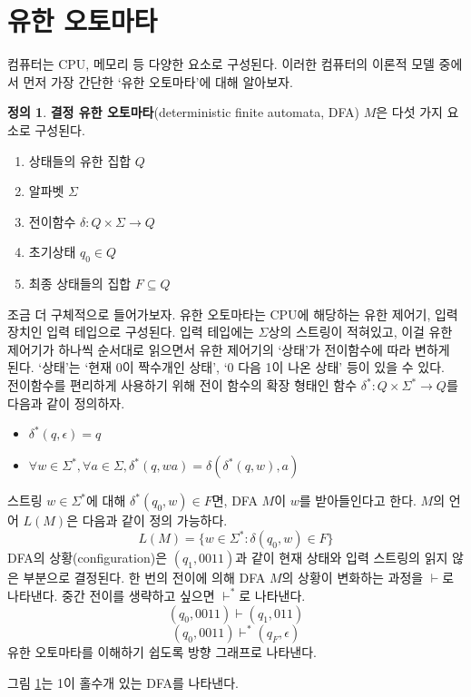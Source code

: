 \documentclass[b5paper, 10pt]{book}
\theoremstyle{definition}
\newtheorem{defn}{정의}[chapter]
\begin{document}
\section{유한 오토마타}
컴퓨터는 CPU, 메모리 등 다양한 요소로 구성된다. 
이러한 컴퓨터의 이론적 모델 중에서 먼저 가장 간단한 `유한 오토마타'에 대해 알아보자.
\begin{defn}
    \textbf{결정 유한 오토마타}(deterministic finite automata, DFA) $M$은 다섯 가지
요소로 구성된다.
\begin{enumerate}
    \item 상태들의 유한 집합 $Q$
    \item 알파벳 $\Sigma$
    \item 전이함수 $\delta : Q \times \Sigma \rightarrow Q$
    \item 초기상태 $q_0 \in Q$
    \item 최종 상태들의 집합 $F \subseteq Q$
\end{enumerate}
\end{defn}
조금 더 구체적으로 들어가보자. 유한 오토마타는 CPU에 해당하는 유한 제어기,
입력장치인 입력 테입으로 구성된다. 입력 테입에는 $\Sigma$상의 스트링이
적혀있고, 이걸 유한 제어기가 하나씩 순서대로 읽으면서 유한 제어기의 `상태'가
전이함수에 따라 변하게 된다. `상태'는 `현재 0이 짝수개인 상태', `0 다음 1이 나온 상태' 등이
있을 수 있다. \\
전이함수를 편리하게 사용하기 위해 전이 함수의 확장 형태인 함수 $\delta^*: Q \times \Sigma^{*} 
\rightarrow Q$를 다음과 같이 정의하자.
\begin{itemize}
    \item $\delta^* (q, \epsilon) = q$
    \item $\forall w \in \Sigma^*, \forall a \in \Sigma, \delta^* (q, wa) = \delta(\delta^*(q,w),a)$
\end{itemize}
스트링 $w \in \Sigma^*$에 대해 $\delta^* (q_0, w ) \in F$면, DFA $M$이 $w$를 받아들인다고 한다.
$M$의 언어 $L(M)$은 다음과 같이 정의 가능하다.
$$L(M) = \{w \in \Sigma^* : \delta (q_0, w) \in F \}$$
DFA의 상황(configuration)은 $(q_1, 0011)$과 같이 
현재 상태와 입력 스트링의 읽지 않은 부분으로 결정된다. 
한 번의 전이에 의해 DFA $M$의 상황이 변화하는 과정을 $\vdash$로 나타낸다.
중간 전이를 생략하고 싶으면 $\vdash^*$로 나타낸다.
$$(q_0, 0011) \vdash (q_1, 011)$$
$$(q_0, 0011) \vdash^* (q_F, \epsilon)$$
유한 오토마타를 이해하기 쉽도록 방향 그래프로 나타낸다.
\begin{figure}[ht]
    \centering
    \caption{} 
    \label{1 odd}
\end{figure}
그림 \ref{1 odd}는 1이 홀수개 있는 DFA를 나타낸다.
\end{document}
